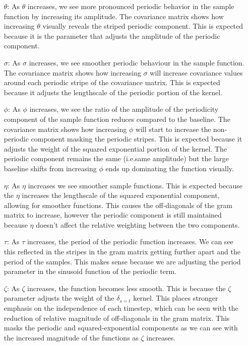 \documentclass[12pt]{article}
\begin{document}
\begin{itemize}
\item [$\theta$:] As $\theta$ increases, we see more pronounced periodic behavior in the sample function by increasing its amplitude.
    The covariance matrix shows how increasing $\theta$ visually reveals the striped periodic component.
        This is expected because it is the parameter that adjusts the amplitude of the periodic component.
\item [$\sigma$:] As $\sigma$ increases, we see smoother periodic behaviour in the sample function.
    The covariance matrix shows how increasing $\sigma$ will increase covariance values around each periodic stripe of the covariance matrix.
    This is expected because it adjusts the lengthscale of the periodic portion of the kernel.
\item [$\phi$:] As $\phi$ increases, we see the ratio of the amplitude of the periodicity component of the sample function reduces compared to the baseline.
    The covariance matrix shows how increasing $\phi$ will start to increase the non-periodic component masking the periodic stripes.
    This is expected because it adjusts the weight of the squared exponential portion of the kernel.
    The periodic component remains the same (i.e.same amplitude) but the large baseline shifts from increasing $\phi$ ends up dominating the function visually.
\item [$\eta$:] As $\eta$ increases we see smoother sample functions.
This is expected because the $\eta$ increases the lengthscale of the squared exponential component, allowing for smoother functions.
This causes the off-diagonals of the gram matrix to increase, however the periodic component is still maintained because $\eta$ doesn't affect the relative weighting between the two components.
\item [$\tau$:] As $\tau$ increases, the period of the periodic function increases.
We can see this reflected in the stripes in the gram matrix getting further apart and the period of the samples.
This makes sense because we are adjusting the period parameter in the sinusoid function of the periodic term.
\item [$\zeta$:] As $\zeta$ increases, the function becomes less smooth.
    This is because the $\zeta$ parameter adjusts the weight of the $\delta_{s=t}$ kernel.
    This places stronger emphasis on the independence of each timestep, which can be seen with the reduction of relative magnitude of off-diagonals in the gram matrix.
    This masks the periodic and squared-exponential components as we can see with the increased magnitude of the functions as $\zeta$ increases.
\end{itemize}
\end{document}
